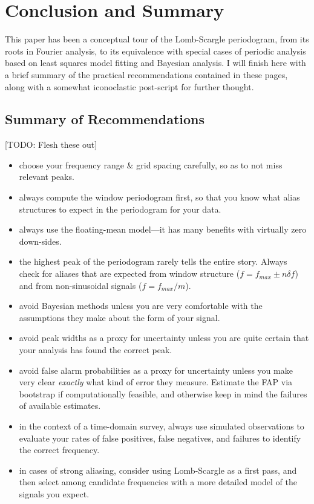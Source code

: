 \documentclass[preprint]{aastex}
\newcommand{\todo}[1]{{\color{red} [TODO: #1]}}
\newcommand{\sectlabel}[1]{\label{sect:#1}}
\begin{document}
\section{Conclusion and Summary}
\sectlabel{conclusion}

This paper has been a conceptual tour of the Lomb-Scargle periodogram, from
its roots in Fourier analysis, to its equivalence with special cases of
periodic analysis based on least squares model fitting and Bayesian
analysis. I will finish here with a brief summary of the practical
recommendations contained in these pages, along with a somewhat iconoclastic
post-script for further thought.

\subsection{Summary of Recommendations}

\todo{Flesh these out}

\begin{itemize}
\item choose your frequency range \& grid spacing carefully, so as to not
  miss relevant peaks.
\item always compute the window periodogram first, so that you know what alias
  structures to expect in the periodogram for your data.
\item always use the floating-mean model---it has many benefits with
  virtually zero down-sides.
\item the highest peak of the periodogram rarely tells the entire story.
  Always check for aliases that are expected from window structure
  ($f = f_{max} \pm n\delta f$) and from non-sinusoidal signals
  ($f = f_{max} / m$).
\item avoid Bayesian methods unless you are very comfortable with the
  assumptions they make about the form of your signal.
\item avoid peak widths as a proxy for uncertainty unless you are quite
  certain that your analysis has found the correct peak.
\item avoid false alarm probabilities as a proxy for uncertainty
  unless you make very clear {\it exactly} what kind of error they measure.
  Estimate the FAP via bootstrap if computationally feasible, and otherwise
  keep in mind the failures of available estimates.
\item in the context of a time-domain survey, always use simulated observations
  to evaluate your rates of false positives, false negatives, and failures to
  identify the correct frequency.
\item in cases of strong aliasing, consider using Lomb-Scargle as a first pass,
  and then select among candidate frequencies with a more detailed model of
  the signals you expect.
\end{itemize}
\end{document}

